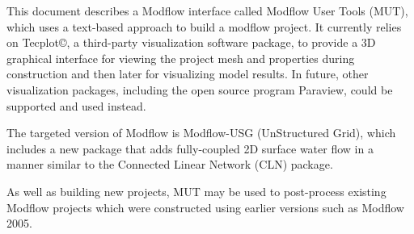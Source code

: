 \newpage

This document describes a Modflow interface called Modflow User Tools (MUT), which uses a
text-based approach to build a modflow project.  It currently relies on Tecplot\copyright, a third-party visualization software package,
to provide a 3D graphical interface for viewing the project mesh and properties during construction and then later for visualizing model results. In future, other visualization packages, including the open source program Paraview, could be supported and used instead.

The targeted version of Modflow is Modflow-USG (UnStructured Grid), which includes a new package that adds fully-coupled 2D surface water flow in a manner similar to the Connected Linear Network (CLN) package. 

As well as building new projects, MUT may be used to post-process existing Modflow projects which were constructed using earlier versions such as Modflow 2005.       